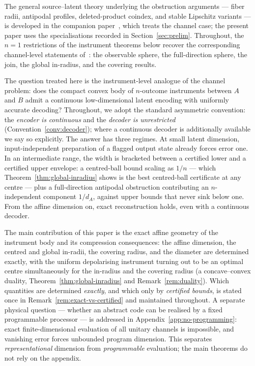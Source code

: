 \documentclass[11pt,a4paper]{article}
\begin{document}
The general source--latent theory underlying the obstruction arguments --- fiber radii, antipodal profiles, deleted-product coindex, and stable Lipschitz variants --- is developed in the companion paper~\cite{CompanionChannels}, which treats the channel case; the present paper uses the specialisations recorded in Section~\ref{sec:prelim}. Throughout, the $n=1$ restrictions of the instrument theorems below recover the corresponding channel-level statements of~\cite{CompanionChannels}: the observable sphere, the full-direction sphere, the join, the global in-radius, and the covering results.

The question treated here is the instrument-level analogue of the channel problem: does the compact convex body of $n$-outcome instruments between $A$ and $B$ admit a continuous low-dimensional latent encoding with uniformly accurate decoding? Throughout, we adopt the standard asymmetric convention: the \emph{encoder is continuous} and the \emph{decoder is unrestricted} (Convention~\ref{conv:decoder}); where a continuous decoder is additionally available we say so explicitly. The answer has three regimes. At small latent dimension, input-independent preparation of a flagged output state already forces error one. In an intermediate range, the width is bracketed between a certified lower and a certified upper envelope: a centred-ball bound scaling as $1/n$ --- which Theorem~\ref{thm:global-inradius} shows is the best centred-ball certificate at any centre --- plus a full-direction antipodal obstruction contributing an $n$-independent component $1/d_A$, against upper bounds that never sink below one. From the affine dimension on, exact reconstruction holds, even with a continuous decoder.

The main contribution of this paper is the exact affine geometry of the instrument body and its compression consequences: the affine dimension, the centred and global in-radii, the covering radius, and the diameter are determined exactly, with the uniform depolarising instrument turning out to be an optimal centre simultaneously for the in-radius and the covering radius (a concave--convex duality, Theorem~\ref{thm:global-inradius} and Remark~\ref{rem:duality}). Which quantities are determined \emph{exactly}, and which only by \emph{certified bounds}, is stated once in Remark~\ref{rem:exact-vs-certified} and maintained throughout. A separate physical question --- whether an abstract code can be realised by a fixed programmable processor --- is addressed in Appendix~\ref{app:no-programming}: exact finite-dimensional evaluation of all unitary channels is impossible, and vanishing error forces unbounded program dimension. This separates \emph{representational} dimension from \emph{programmable} evaluation; the main theorems do not rely on the appendix.
\end{document}

